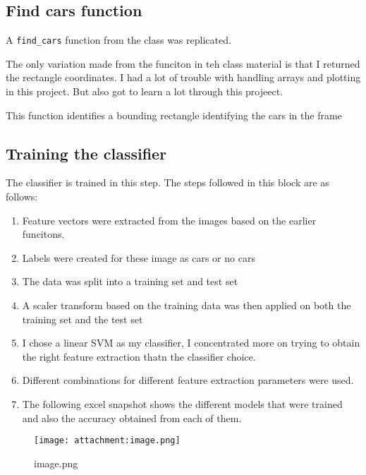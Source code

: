 \documentclass[11pt]{article}
\makeatletter
\def\maxwidth{\ifdim\Gin@nat@width>\linewidth\linewidth
    \else\Gin@nat@width\fi}
\let\Oldincludegraphics\includegraphics
\renewcommand{\includegraphics}[1]{\Oldincludegraphics[width=.8\maxwidth]{#1}}
\providecommand{\tightlist}{%
      \setlength{\itemsep}{0pt}\setlength{\parskip}{0pt}}
\makeatother
\begin{document}
    \hypertarget{find-cars-function}{%
\subsection{Find cars function}\label{find-cars-function}}

A \texttt{find\_cars} function from the class was replicated.

The only variation made from the funciton in teh class material is that
I returned the rectangle coordinates. I had a lot of trouble with
handling arrays and plotting in this project. But also got to learn a
lot through this projeect.

This function identifies a bounding rectangle identifying the cars in
the frame

    \hypertarget{training-the-classifier}{%
\subsection{Training the classifier}\label{training-the-classifier}}

The classifier is trained in this step. The steps followed in this block
are as follows:

\begin{enumerate}
\def\labelenumi{\arabic{enumi}.}
\tightlist
\item
  Feature vectors were extracted from the images based on the earlier
  funcitons.
\item
  Labels were created for these image as cars or no cars
\item
  The data was split into a training set and test set
\item
  A scaler transform based on the training data was then applied on both
  the training set and the test set
\item
  I chose a linear SVM as my classifier, I concentrated more on trying
  to obtain the right feature extraction thatn the classifier choice.
\item
  Different combinations for different feature extraction parameters
  were used.
\item
  The following excel snapshot shows the different models that were
  trained and also the accuracy obtained from each of them.
\end{enumerate}

\begin{figure}
\centering
\texttt{[image: attachment:image.png]}
\caption{image.png}
\end{figure}
\end{document}
